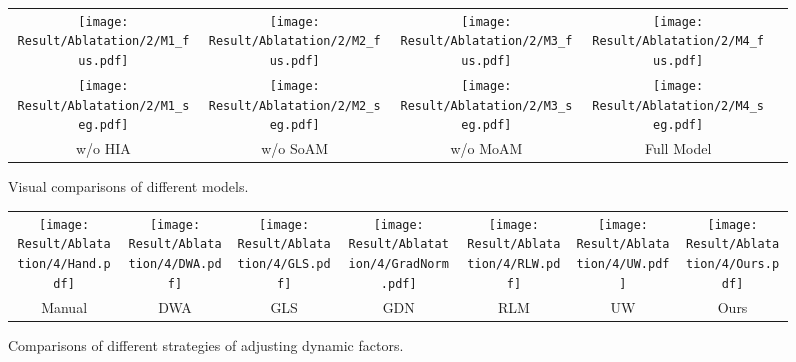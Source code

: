 \documentclass[10pt,twocolumn,letterpaper]{article}
\begin{document}
\begin{figure}[!htb]
	\centering
	\setlength{\tabcolsep}{1pt}
	\begin{tabular}{ccccc}
		
		\texttt{[image: Result/Ablatation/2/M1\_fus.pdf]}
		&\texttt{[image: Result/Ablatation/2/M2\_fus.pdf]}
		&\texttt{[image: Result/Ablatation/2/M3\_fus.pdf]}
		&\texttt{[image: Result/Ablatation/2/M4\_fus.pdf]}
		\\
		\texttt{[image: Result/Ablatation/2/M1\_seg.pdf]}
		&\texttt{[image: Result/Ablatation/2/M2\_seg.pdf]}
		&\texttt{[image: Result/Ablatation/2/M3\_seg.pdf]}
		&\texttt{[image: Result/Ablatation/2/M4\_seg.pdf]}
		\\
		\footnotesize w/o HIA&\footnotesize w/o SoAM&\footnotesize w/o MoAM&\footnotesize Full Model				
	\end{tabular}
	\vspace{-0.3cm}
	\caption{Visual comparisons of different models. }
	\label{fig:trainings}
\end{figure}
\vspace{-0.2cm}
\begin{figure}[!htb]
	\centering
	\setlength{\tabcolsep}{1pt}
	\begin{tabular}{ccccccc}
		\texttt{[image: Result/Ablatation/4/Hand.pdf]}
		&\texttt{[image: Result/Ablatation/4/DWA.pdf]}
		&\texttt{[image: Result/Ablatation/4/GLS.pdf]}
		&\texttt{[image: Result/Ablatation/4/GradNorm.pdf]}
		
		&\texttt{[image: Result/Ablatation/4/RLW.pdf]}
		&\texttt{[image: Result/Ablatation/4/UW.pdf]}
		&\texttt{[image: Result/Ablatation/4/Ours.pdf]}
		\\
		\footnotesize Manual&	\footnotesize DWA\cite{liu2019end}&\footnotesize GLS\cite{chennupati2019multinet++}&\footnotesize GDN\cite{chen2018gradnorm}&\footnotesize RLM\cite{lin2021closer}&\footnotesize UW\cite{kendall2018multi}&\footnotesize Ours				
	\end{tabular}
	\vspace{-0.2cm}
	\caption{Comparisons of different strategies of adjusting dynamic factors. }
	\label{fig:lamda}
\end{figure}
\end{document}
